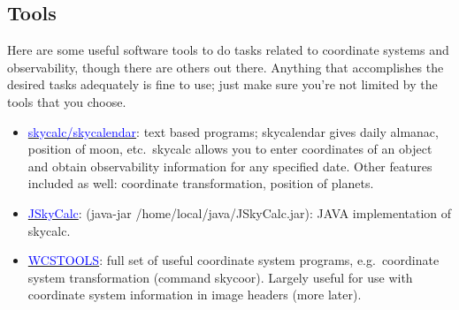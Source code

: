 \documentclass[12pt]{article}
\begin{document}
\subsection*{Tools}
Here are some useful software tools to do tasks related to coordinate systems
and observability, though there are others out there. Anything that
accomplishes the desired tasks adequately is fine to use; just make sure
you're not limited by the tools that you choose.
\begin{itemize}
    \item \href{http://physics.dartmouth.edu/}
        {\textcolor{blue}{skycalc/skycalendar}}:
        text based programs; skycalendar gives daily almanac, position of moon,
        etc.\ skycalc allows you to enter coordinates of an object and obtain
        observability information for any specified date. Other features included
        as well: coordinate transformation, position of planets.
    \item \href{http://physics.dartmouth.edu/}
        {\textcolor{blue}{JSkyCalc}}:
        (java-jar /home/local/java/JSkyCalc.jar): JAVA implementation
        of skycalc.
    \item \href{http://tdc-www.harvard.edu/wcstools/}
        {\textcolor{blue}{WCSTOOLS}}: full set of useful coordinate
        system programs, e.g.\ coordinate system transformation (command skycoor).
        Largely useful for use with coordinate system information in image
        headers (more later).
\end{itemize}
\end{document}
